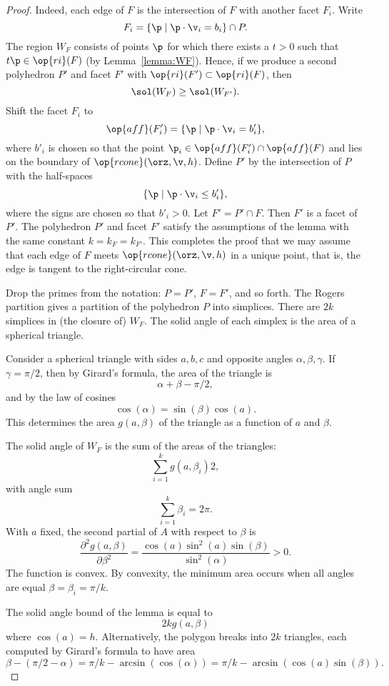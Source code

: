 \begin{proof} 
  Indeed,
each edge of $F$ is the intersection of $F$ with another facet
$F_i$.  Write
\[  
F_i = \{\p \mid \p \cdot \v_i = b_i\} \cap P.
\] 
The region $W_F$ consists of points $\p$ for which there exists a
$t>0$ such that $t\p \in\op{ri}(F)$ (by Lemma~\ref{lemma:WF}).  Hence,
if we produce a second polyhedron $P'$ and facet $F'$ with
$\op{ri}(F')\subset \op{ri}(F)$, then
\[  
\sol(W_F)\ge \sol(W_{F'}).
\] 
Shift the facet $F_i$ to
\[  
\op{aff}(F'_i) = \{\p \mid \p \cdot \v_i = b'_i\},
\] 
where $b'_i$ is chosen so that the point $\p_i\in \op{aff}(F'_i)\cap
\op{aff}(F)$ and lies on the boundary of $\op{rcone}(\orz,\v,h)$.
Define $P'$ by the intersection of $P$ with the half-spaces
\[  
\{\p \mid \p \cdot \v_i \le b'_i\},
\] 
where the signs are chosen so that $b'_i>0$.  Let $F' = P'\cap F$.
Then $F'$ is a facet of $P'$.  The polyhedron $P'$ and facet $F'$
satisfy the assumptions of the lemma with the same constant $k= k_F =
k_{F'}$.  This completes the proof that we may assume that each edge
of $F$ meets $\op{rcone}(\orz,\v,h)$ in a unique point,  that is, the
edge is tangent to the right-circular cone.

Drop the primes from the notation: $P=P'$, $F=F'$, and so forth.  The
Rogers partition gives a partition of the polyhedron $P$ into
simplices.  There are $2k$ simplices in (the closure of) $W_F$.  The
solid angle of each simplex is the area of a spherical triangle.

Consider a spherical triangle with sides $a,b,c$ and opposite angles
$\alpha,\beta,\gamma$.  If $\gamma=\pi/2$, then by Girard's formula,
the area of the triangle is
\[  
\alpha+\beta-\pi/2,
\] 
and by the law of cosines 
\[  
\cos(\alpha) =\sin(\beta)\cos(a).
\] 
This determines the area $g(a,\beta)$ of the triangle 
as a function of $a$ and $\beta$. 
%
%
%
%
%
%
%
%

The solid angle of $W_F$ is the sum of the areas of the triangles:
\[  
\sum_{i=1}^k g(a,\beta_i) 2,
\] 
with angle sum
\[  
\sum_{i=1}^k \beta_i = 2\pi.
\] 
With  $a$ fixed, the second partial of $A$ with respect to $\beta$ is
\[  
\frac{\partial^2 g(a,\beta)}{\partial \beta^2} = 
\frac{\cos(a)\sin^2(a)\sin(\beta)}{\sin^2(\alpha)} > 0.
\] 
The function is convex.
By convexity, the minimum area occurs when all angles are equal
$\beta=\beta_i = \pi/k$.

The solid angle bound of the lemma is equal to 
\[  
2 k g(a,\beta)
\] 
where $\cos(a)=h$.  Alternatively, the polygon breaks into $2k$
triangles, each computed by Girard's formula to have area
\[  
\beta - (\pi/2 - \alpha)  = \pi/k - \arcsin(\cos(\alpha)) = 
\pi/k - \arcsin(\cos(a)\sin(\beta)).
\] 
\end{proof}

